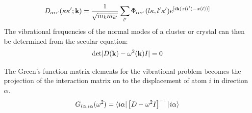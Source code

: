 \begin{equation}
D_{\alpha\alpha'}(\kappa\kappa';{\bf k}) = \frac{1}{\sqrt{m_{k}m_{k'}}} \sum_{l'} \Phi_{\alpha\alpha'}(l\kappa,l'\kappa') e^{[i{\bf k}(x(l')-x(l))]}
\end{equation}
%
The vibrational frequencies of the normal modes of a cluster or crystal can then be determined 
from the secular equation:
%
\begin{equation}
{\rm det}|D({\bf k}) - \omega^{2}({\bf k})I| = 0
\end{equation}
%

The Green's function matrix elements for the vibrational problem 
becomes the projection of the interaction matrix on to the 
displacement of atom $i$ in direction $\alpha$.
%
\begin{equation}
G_{i\alpha,i\alpha}(\omega^{2})= \langle i\alpha| \left[D- \omega^{2}I\right]^{-1} |i\alpha \rangle
\end{equation}
%

